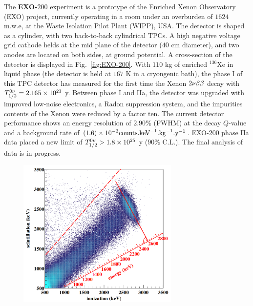 The \textbf{EXO-$200$} experiment is a prototype of the Enriched Xenon Observatory (EXO) project, currently operating in a room under an overburden of $1624$ m.w.e, at the Waste Isolation Pilot Plant (WIPP), USA.
The detector is shaped as a cylinder, with two back-to-back cylindrical TPCs.
A high negative voltage grid cathode helds at the mid plane of the detector ($40$ cm diameter), and two anodes are located on both sides, at ground potential.
A cross-section of the detector is displayed in Fig.~\ref{fig:EXO-200}.
With $110$ kg of enriched $^{136}$Xe in liquid phase (the detector is held at $167$ K in a cryongenic bath), the phase I of this TPC detector has measured for the first time the Xenon $2\nu\beta\beta$ decay with $T_{1/2}^{0\nu}=2.165\times 10^{21}$ y.
Between phase I and IIa, the detector was upgraded with improved low-noise electronics, a Radon suppression system, and the impurities contents of the Xenon were reduced by a factor ten.
The current detector performance shows an energy resolution of $2.90$\% (FWHM) at the decay $Q$-value and a background rate of $(1.6)\times 10^{-3}\text{counts.keV}^{-1}\text{.kg}^{-1}\text{.y}^{-1}$.
EXO-$200$ phase IIa data placed a new limit of $T_{1/2}^{0\nu}>1.8\times 10^{25}$ y ($90$\% C.L.).
The final analysis of data is in progress.


\begin{figure}
  \centering
  \includegraphics[width=8cm]{0nubbexperiments/fig_0nubbexperiments/ionisation-to-scintillation_EXO-200.png}
  \caption{\label{fig:ratio_EXO-200}}

\end{figure}

